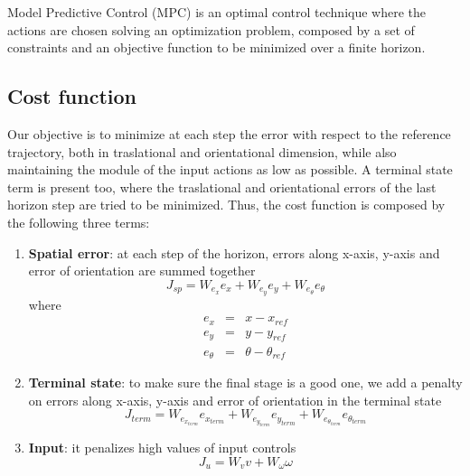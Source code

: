 Model Predictive Control (MPC) is an optimal control technique where the actions are 
chosen solving an optimization problem, composed by a set of constraints and an
objective function to be minimized over a finite horizon.

\subsection{Cost function}
Our objective is to minimize at each step the error with respect to the reference 
trajectory, both in traslational and orientational dimension, while also maintaining the
module of the input actions as low as possible. A terminal state term is present too,
where the traslational and orientational errors of the last horizon step are tried to 
be minimized. Thus, the cost function is composed by the following three terms:
\begin{enumerate}
    \item \textbf{Spatial error}: at each step of the horizon, errors along x-axis, y-axis and error of orientation 
                                  are summed together
                                  \begin{equation}
                                      J_{sp} = W_{e_x} e_x + W_{e_y} e_y + W_{e_{\theta}} e_{\theta}
                                  \end{equation}
                                  where 
                                  \begin{subequations}
                                    \begin{eqnarray}
                                        e_x &=& x - x_{ref} \\
                                        e_y &=& y - y_{ref} \\
                                        e_\theta &=& \theta - \theta_{ref}
                                    \end{eqnarray}
                                  \end{subequations}

    \item \textbf{Terminal state}: to make sure the final stage is a good one, we add a penalty on errors along x-axis, y-axis and error of orientation
                                   in the terminal state
                                   \begin{equation}
                                        J_{term} = W_{e_{x_{term}}} e_{x_{term}} + W_{e_{y_{term}}} e_{y_{term}} + W_{e_{{\theta}_{term}}} e_{{\theta}_{term}}
                                   \end{equation}

    \item \textbf{Input}: it penalizes high values of input controls 
                                   \begin{equation}
                                        J_{u} = W_{v} v + W_{\omega}  \omega
                                   \end{equation}
                               

\end{enumerate}

